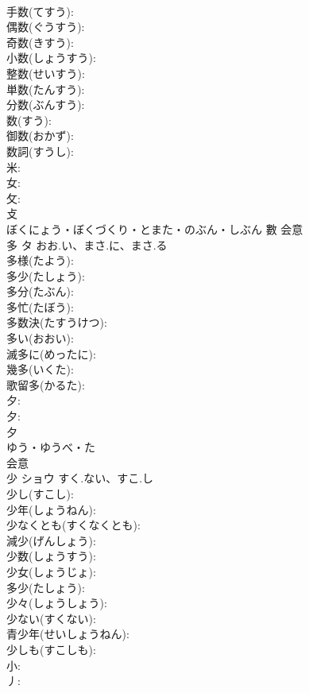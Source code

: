 \documentclass[8pt]{extreport}
\begin{document}
\begin{CJK}{UTF8}{min}
\\	手数(てすう): 
\\	偶数(ぐうすう): 
\\	奇数(きすう): 
\\	小数(しょうすう): 
\\	整数(せいすう): 
\\	単数(たんすう): 
\\	分数(ぶんすう): 
\\	数(すう): 
\\	御数(おかず): 
\\	数詞(すうし): 
\\	米: 
\\	女: 
\\	攵: 
\\	攴	
\\	ぼくにょう・ぼくづくり・とまた・のぶん・しぶん	數	会意 
\\	多	タ	おお.い、まさ.に、まさ.る		
\\	多様(たよう): 
\\	多少(たしょう): 
\\	多分(たぶん): 
\\	多忙(たぼう): 
\\	多数決(たすうけつ): 
\\	多い(おおい): 
\\	滅多に(めったに): 
\\	幾多(いくた): 
\\	歌留多(かるた): 
\\	夕: 
\\	夕: 
\\	夕	
\\	ゆう・ゆうべ・た	
\\	会意 
\\	少	ショウ	すく.ない、すこ.し		
\\	少し(すこし): 
\\	少年(しょうねん): 
\\	少なくとも(すくなくとも): 
\\	減少(げんしょう): 
\\	少数(しょうすう): 
\\	少女(しょうじょ): 
\\	多少(たしょう): 
\\	少々(しょうしょう): 
\\	少ない(すくない): 
\\	青少年(せいしょうねん): 
\\	少しも(すこしも): 
\\	小: 
\\	丿: 

\end{CJK}
\end{document}
